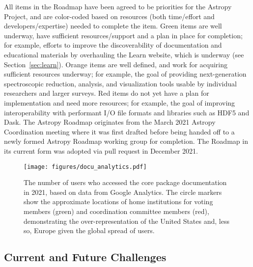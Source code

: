 \documentclass[modern]{aastex631}
\begin{document}
All items in the Roadmap have been agreed to be priorities for the Astropy
Project, and are color-coded based on resources (both time/effort and
developers/expertise) needed to complete the item. Green items are well
underway, have sufficient resources/support and a plan in place for completion;
for example, efforts to improve the discoverability of documentation and
educational materials by overhauling the Learn website, which is underway (see
Section~\ref{sec:learn}).
Orange items are well defined, and work for acquiring sufficient resources
underway; for example, the goal of providing next-generation spectroscopic
reduction, analysis, and visualization tools usable by individual researchers
and larger surveys.
Red items do not yet have a plan for implementation and need more resources; for
example, the goal of improving interoperability with performant I/O file formats
and libraries such as HDF5 and Dask.
The Astropy Roadmap originates from the March 2021 Astropy Coordination meeting
where it was first drafted before being handed off to a newly formed Astropy
Roadmap working group for completion. The Roadmap in its current form was
adopted via pull request in December 2021.

\begin{figure}[th!]
  \begin{centering}
    \texttt{[image: figures/docu\_analytics.pdf]}
      \caption{
          The number of users who accessed the \astropypkg core package
          documentation in 2021, based on data from Google Analytics.
          The circle markers show the approximate locations of home institutions
          for \astropy voting members (green) and coordination committee members
          (red), demonstrating the over-representation of the United States and,
          less so, Europe given the global spread of \astropypkg users.
      }
      \label{fig:User-analytics-locations}
  \end{centering}
\end{figure}

\subsection{Current and Future Challenges}
\end{document}
